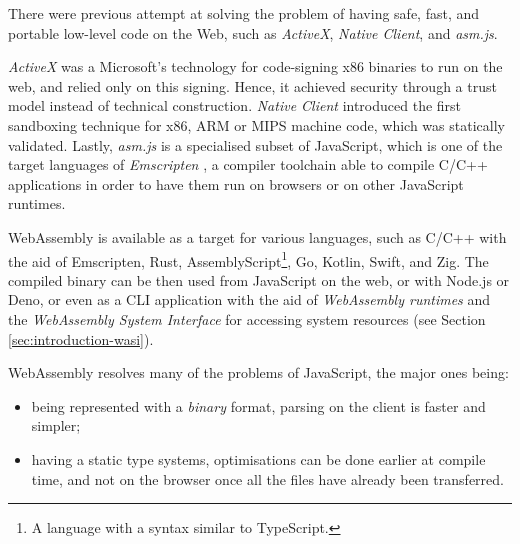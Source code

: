 There were previous attempt at solving the problem of having safe, fast, and portable low-level code on the Web,
such as \textit{ActiveX}, \textit{Native Client}, and \textit{asm.js}.

\textit{ActiveX} \cite{activex} was a Microsoft's technology for code-signing x86 binaries to run on the web, and relied only
on this signing. Hence, it achieved security through a trust model instead of technical construction.
\textit{Native Client} \cite{native-client} introduced the first sandboxing technique for x86, ARM or MIPS machine code,
which was statically validated. Lastly, \textit{asm.js} \cite{asmjs} is a specialised subset of JavaScript, which is one of the target
languages of \textit{Emscripten} \cite{emscripten}, a compiler toolchain able to compile C/C++ applications in order to have them
run on browsers or on other JavaScript runtimes.

WebAssembly is available as a target for various languages, such as C/C++ with the aid of Emscripten, Rust,
AssemblyScript\footnote{A language with a syntax similar to TypeScript.}, Go, Kotlin, Swift, and Zig.
The compiled binary can be then used from JavaScript on the web, or with Node.js or Deno, or even as a CLI application
with the aid of \textit{WebAssembly runtimes} and the \textit{WebAssembly System Interface}
for accessing system resources (see Section \ref{sec:introduction-wasi}).

WebAssembly resolves many of the problems of JavaScript, the major ones being:
\begin{itemize}
  \item being represented with a \textit{binary} format, parsing on the client is faster and simpler;
  \item having a static type systems, optimisations can be done earlier at compile time, and not on the browser once all the files
        have already been transferred.
\end{itemize}

\vspace*{0.5cm}

